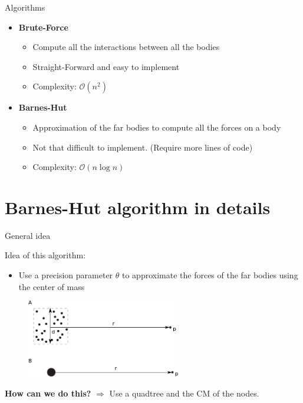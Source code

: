 \documentclass[10pt]{beamer}
\begin{document}
\begin{frame}{Algorithms}

\begin{itemize}
\item {\bf Brute-Force}
\begin{itemize}
\item Compute all the interactions between all the bodies
\item Straight-Forward and easy to implement
\item Complexity: $\mathcal{O}(n^2)$
\end{itemize}
\vspace{0.5cm}
\item {\bf Barnes-Hut}
\begin{itemize}
\item Approximation of the far bodies to compute all the forces on a body
\item Not that difficult to implement. (Require more lines of code)
\item Complexity: $\mathcal{O}(n\log n)$
\end{itemize}
\end{itemize}

\end{frame}

\section{Barnes-Hut algorithm in details}

\begin{frame}{General idea}

Idea of this algorithm:
\begin{itemize}
\item Use a precision parameter $\theta$ to approximate the forces of the far bodies using the center of mass
\end{itemize}
\begin{figure}
\centering
\includegraphics[width=0.6\textwidth]{./images/bh.png}
\end{figure}
{\bf How can we do this?}  $\Rightarrow$ Use a quadtree and the CM of the nodes.
\end{frame}
\end{document}
